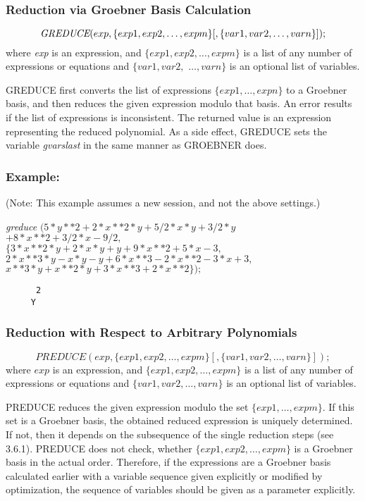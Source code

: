 \subsubsection{Reduction via Groebner Basis Calculation}
\[
\mbox{\it  GREDUCE}(exp, \{exp1, exp2, \ldots , expm\}[,\{var1, var2,
\ldots , varn\}]);
\]
where {\it exp} is an expression, and $\{exp1, exp2,\ldots , expm\}$ is
a list of any number of expressions or equations and $\{var1, var2,$
$\ldots , varn\}$ is an optional list of variables.

GREDUCE first converts the list of expressions $\{exp1, \ldots ,
expn\}$ to a Groeb\-ner basis, and then reduces the given expression
modulo that basis.  An error results if the list of expressions is
inconsistent. The returned value is an expression representing the
reduced polynomial. As a side effect, GREDUCE sets the variable {\it
gvarslast} in the same manner as GROEBNER does.

\subsubsection*{Example:}
(Note: This example assumes a new session, and not the above
settings.)

{\it greduce} $( 5*y**2 + 2*x**2*y + 5/2*x*y + 3/2*y$\\
\hspace*{+1cm} $ + 8*x**2 + 3/2*x - 9/2, $\\
\hspace*{+1cm} $\{ 3*x**2*y + 2*x*y + y + 9*x**2 + 5*x - 3,$ \\
\hspace*{+1cm} $ 2*x**3*y - x*y - y + 6*x**3 - 2*x**2 - 3*x + 3,$ \\
\hspace*{+1cm} $ x**3*y + x**2*y + 3*x**3 + 2*x**2 \});$
\begin{verbatim}
      2
     Y
\end{verbatim}
\subsubsection{Reduction with Respect to Arbitrary Polynomials}
\[
 PREDUCE(exp, \{exp1, exp2,\ldots , expm\}[,\{var1, var2,\ldots ,
varn\}]);
\]
where $ exp $  is an expression, and $\{exp1, exp2, \ldots ,
expm \}$ is a list of any number of expressions or equations and
$\{var1, var2, \ldots , varn\}$ is an optional list of variables.

PREDUCE reduces the given expression modulo the set $\{exp1,
\ldots , expm\}$. If this set is a Groebner basis, the obtained reduced
expression is uniquely determined. If not, then it depends on the
subsequence of the single reduction steps (see 3.6.1). PREDUCE does
not check, whether $\{exp1, exp2, \ldots , expm\}$ is a Groebner
basis in the actual order. Therefore, if the expressions are a
Groebner basis calculated earlier with a variable sequence given
explicitly or modified by optimization, the sequence of variables
should be given as a parameter explicitly.

